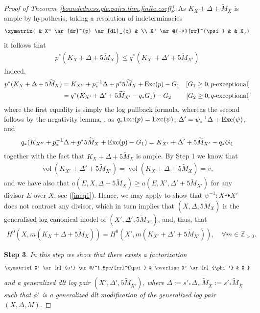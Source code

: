 \documentclass[12pt, a4paper]{amsart}
\DeclareMathOperator{\vol}{\mathrm{vol}}
\newcounter{Theorem}
\theoremstyle{definition}
\theoremstyle{named}
\begin{document}
\begin{proof}[Proof of Theorem~\ref{boundedness.glc.pairs.thm.finite.coeff}]
As 
$K_{X}+ \Delta + \widetilde{M}_X$ 
is ample by hypothesis,
taking a resolution of indeterminacies
\begin{align*}
\xymatrix{
& X'' \ar[dr]^{p} \ar[dl]_{q} & 
\\
X' \ar@{-->}[rr]^{\psi} & & X,}
\end{align*}
it follows that 
\begin{align}
\label{ineq1}
p^\ast (K_{X}+ \Delta+ 5\widetilde{M}_X)
\leq 
q^\ast(K_{X'}+\Delta'+5\widetilde{M}_{X'})
\end{align}
Indeed, 
\begin{align*}
    p^\ast (K_{X}+ \Delta+ 5\widetilde{M}_X) & = 
    K_{X''}+ p_\ast^{-1}\Delta + p^\ast 5\widetilde{M}_X + {\rm Exc}(p)-G_1 
    & [G_1 \geq 0, \text{$p$-exceptional}]
    \\
    & = q^\ast(K_{X'}+\Delta'+5\widetilde{M}_{X'}-q_\ast G_1) - G_2  
    & [G_2 \geq 0, \text{$q$-exceptional}]
\end{align*} 
where the first equality is simply the log pullback formula, whereas the second follows by the negativity lemma, \cite[Lemma 3.39]{KM98},
as 
$q_\ast {\rm Exc}(p) = {\rm Exc}(\psi)$, 
$\Delta'=\psi_\ast^{-1} \Delta +{\rm Exc}(\psi)$, 
and
\begin{align*}
q_\ast (K_{X''}+ p_\ast^{-1}\Delta + p^\ast 5\widetilde{M}_X + {\rm Exc}(p)-G_1)= 
K_{X'}+\Delta'+5\widetilde{M}_{X'}-q_\ast G_1
\end{align*}
together with the fact that 
$K_{X}+ \Delta+ 5\widetilde{M}_{X}$ 
is ample.
By Step 1 we know that 
\begin{align*}
\vol(K_{X'}+\Delta'+5\widetilde{M}_{X'}) = \vol(K_{X}+\Delta+5\widetilde{M}_{X})=v,
\end{align*}
and we have also that  
$a(E, X, \Delta+5\widetilde{M}_X) \ge a(E, X', \Delta'+5\widetilde{M}_{X'})$
for any divisor 
$E$ 
over 
$X$, 
see (\ref{ineq1}).
Hence, we may apply
\cite[Lemma 2.17]{bir.2103}
to show that
$\psi^{-1} \colon 
X \dashrightarrow X'$ 
does not contract any divisor, which in turn implies that 
$(X, \Delta, 5\widetilde{M}_X)$
is the generalised log canonical model of 
$(X', \Delta', 5\widetilde{M}_{X'})$, 
and, thus, that
\begin{align}
\label{eqn.section.rings}
H^0(X, m(K_X+\Delta+5\widetilde{M}_X))=
H^0(X', m(K_{X'}+\Delta'+5\widetilde{M}_{X'})), 
\quad \forall m \in \mathbb Z_{>0}.
\end{align}

\medskip

{\bf Step 3}.
{\it In this step we show that there exists a factorization
\begin{align*}
    \xymatrix{
   X'
    \ar[r]_{s'}
    \ar@/^1.5pc/[rr]^{\psi}
    &
   \overline X'
    \ar[r]_{\phi'}
    &
    X
    }
\end{align*}
and a generalized dlt log pair
$(\overline X', \overline{\Delta}', 5\widetilde{M}_{\overline X'})$, 
where
$\overline \Delta:=s'_\ast \overline \Delta$, 
$\widetilde{M}_{\overline X}:=s'_\ast \widetilde{M}_{\overline X}$
such that 
$\phi'$
is a generalized dlt modification of the generalized log pair 
$(X, \Delta, M)$.}


\end{proof}
\end{document}
